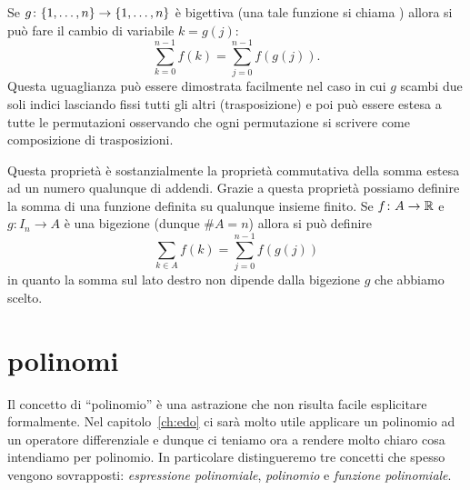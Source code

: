 Se $g\colon {\left\{ 1,\dots, n \right\}} \to {\left\{ 1,\dots, n \right\}}$
è bigettiva (una tale funzione si chiama )
allora si può fare il cambio di variabile $k=g(j)$:
\[
    \sum_{k=0}^{n-1} f(k) = \sum_{j=0}^{n-1} f(g(j)).
\]
Questa uguaglianza può essere dimostrata facilmente nel caso 
in cui $g$ scambi due soli indici lasciando fissi tutti gli altri 
(trasposizione) e poi può essere estesa a tutte le permutazioni
osservando che ogni permutazione si scrivere come composizione 
di trasposizioni.

Questa proprietà è sostanzialmente la proprietà commutativa della somma 
estesa ad un numero qualunque di addendi.
Grazie a questa proprietà possiamo definire la somma di una funzione 
definita su qualunque insieme finito. 
Se $f\colon A \to {\mathbb R}$ e $g\colon I_n \to A$ è una bigezione (dunque $\#A = n$)
allora si può definire 
\[
  \sum_{k\in A} f(k) = \sum_{j=0}^{n-1} f(g(j))  
\]
in quanto la somma sul lato destro non dipende dalla bigezione $g$ che 
abbiamo scelto.

\section{polinomi}
\label{ch:polinomi}

Il concetto di ``polinomio'' è una astrazione che non risulta facile esplicitare formalmente.
Nel capitolo~\ref{ch:edo} ci sarà molto utile applicare un polinomio ad un operatore 
differenziale e dunque ci teniamo ora a rendere molto chiaro cosa intendiamo per polinomio.
In particolare distingueremo tre concetti che spesso vengono sovrapposti: 
\emph{espressione polinomiale}, \emph{polinomio} e \emph{funzione polinomiale}.

